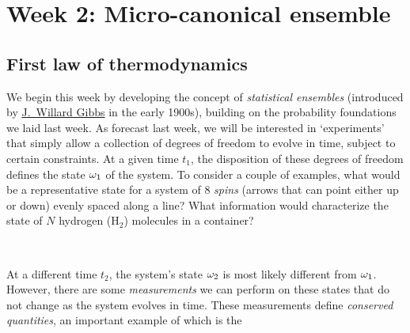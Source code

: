 \renewcommand{\thisweek}{MATH327 Week 2}
\renewcommand{\moddate}{Last modified 2 Feb.~2021}
\setcounter{section}{2}
\setcounter{subsection}{0}
{}
\section*{Week 2: Micro-canonical ensemble}

\subsection{First law of thermodynamics}
We begin this week by developing the concept of \textit{statistical ensembles} (introduced by \href{https://en.wikipedia.org/wiki/Josiah_Willard_Gibbs}{J.\ Willard Gibbs} in the early 1900s), building on the probability foundations we laid last week.
As forecast last week, we will be interested in `experiments' that simply allow a collection of degrees of freedom to evolve in time, subject to certain constraints.
At a given time $t_1$, the disposition of these degrees of freedom defines the state $\omega_1$ of the system.
To consider a couple of examples, what would be a representative state for a system of $8$ \textit{spins} (arrows that can point either up or down) evenly spaced along a line?
What information would characterize the state of $N$ hydrogen (H$_2$) molecules in a container?
\begin{mdframed}
  \ \\[100 pt]
\end{mdframed}

At a different time $t_2$, the system's state $\omega_2$ is most likely different from $\omega_1$.
However, there are some \textit{measurements} we can perform on these states that do not change as the system evolves in time.
These measurements define \textit{conserved quantities}, an important example of which is the 

